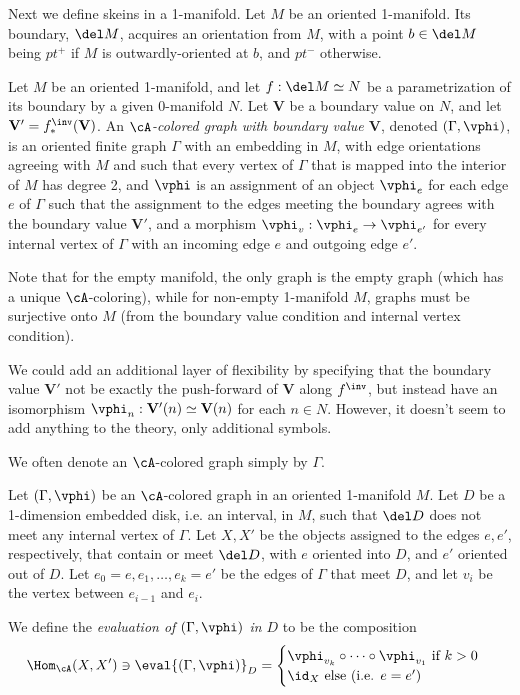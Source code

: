 \documentclass[12pt]{article}
\newcommand{\VV}{{\mathbf{V}}}
\begin{document}
Next we define skeins in a 1-manifold.
Let $M$ be an oriented 1-manifold.
Its boundary, $\del M$, acquires an orientation from $M$,
with a point $b \in \del M$ being $pt^+$ if $M$
is outwardly-oriented at $b$, and $pt^-$ otherwise.

\begin{definition}
\label{d:A-colored-graph}
Let $M$ be an oriented 1-manifold,
and let $f: \del M \simeq N$
be a parametrization of its boundary by a given 0-manifold $N$.
Let $\VV$ be a boundary value on $N$,
and let $\VV' = f_*^\inv(\VV)$.
An \emph{$\cA$-colored graph with boundary value $\VV$},
denoted $(\Gamma,\vphi)$,
is an oriented finite graph $\Gamma$ with an embedding in $M$,
with edge orientations agreeing with $M$
and such that every vertex of $\Gamma$
that is mapped into the interior of $M$ has degree 2,
and $\vphi$ is an assignment of an object $\vphi_e$
for each edge $e$ of $\Gamma$
such that the assignment to the edges meeting the boundary
agrees with the boundary value $\VV'$,
and a morphism $\vphi_v: \vphi_e \to \vphi_{e'}$
for every internal vertex of $\Gamma$
with an incoming edge $e$ and outgoing edge $e'$.
\end{definition}

Note that for the empty manifold, the only graph is the empty graph
(which has a unique $\cA$-coloring),
while for non-empty 1-manifold $M$,
graphs must be surjective onto $M$
(from the boundary value condition and internal vertex condition).

\begin{remark}
We could add an additional layer of flexibility
by specifying that the boundary value $\VV'$
not be exactly the push-forward of $\VV$ along $f^\inv$,
but instead have an isomorphism
$\vphi_n : \VV'(n) \simeq \VV(n)$ for each $n \in N$.
However, it doesn't seem to add anything to the theory,
only additional symbols.
\end{remark}

We often denote an $\cA$-colored graph simply by $\Gamma$.

\begin{definition}
\label{d:local-ev}
Let $(\Gamma,\vphi)$ be an $\cA$-colored graph
in an oriented 1-manifold $M$.
Let $D$ be a 1-dimension embedded disk, i.e. an interval, in $M$,
such that $\del D$ does not meet any internal vertex of $\Gamma$.
Let $X,X'$ be the objects assigned to the edges $e,e'$,
respectively, that contain or meet $\del D$,
with $e$ oriented into $D$, and $e'$ oriented out of $D$.
Let $e_0 = e, e_1,\ldots,e_k = e'$ be the edges
of $\Gamma$ that meet $D$, and let
$v_i$ be the vertex between $e_{i-1}$ and $e_i$.

We define the \emph{evaluation of $(\Gamma,\vphi)$ in $D$}
to be the composition
\[
\Hom_\cA(X,X') \ni
\eval{(\Gamma,\vphi)}_D
=
\begin{cases}
\vphi_{v_k} \circ \cdots \circ \vphi_{v_1}
\textrm{ if } k >0
\\
\id_X \textrm{ else (i.e. } e = e')
\end{cases}
\]
\end{definition}
\end{document}
